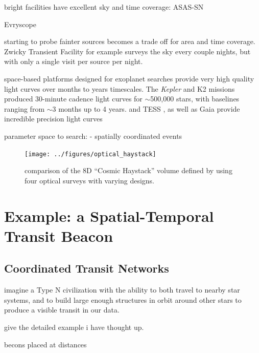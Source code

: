 \documentclass[twocolumn]{aastex62}
\newcommand{\Kepler}{\textsl{Kepler}\xspace}
\begin{document}
bright facilities have excellent sky and time coverage:
ASAS-SN \citep{kochanek2017}

Evryscope \citep{law2015}

starting to probe fainter sources becomes a trade off for area and time coverage.
Zwicky Transient Facility \citep{bellm2014}
for example surveys the sky every couple nights, but with only a single visit per source per night.


space-based platforms designed for exoplanet searches provide very high quality light curves over months to years timescales. The \Kepler and K2 missions \citep{borucki2010,howell2014} produced 30-minute cadence light curves for $\sim$500,000 stars, with baselines ranging from $\sim$3 months up to 4 years. 
and TESS \citep{tess}, as well as Gaia \citep{gaia} provide incredible precision light curves



parameter space to search:
- spatially coordinated events


\begin{figure}[]
\centering
\texttt{[image: ../figures/optical\_haystack]}
\caption{
comparison of the 8D ``Cosmic Haystack'' volume defined by \citet{wright2018c} using four optical surveys with varying designs.
}
\label{fig:hay}
\end{figure}




\section{Example: a Spatial-Temporal Transit Beacon}
\label{sec:transit}


\subsection{Coordinated Transit Networks}
imagine a Type N civilization with the ability to both travel to nearby star systems, and to build large enough structures in orbit around other stars to produce a visible transit in our data.

give the detailed example i have thought up.

becons placed at distances
\end{document}
